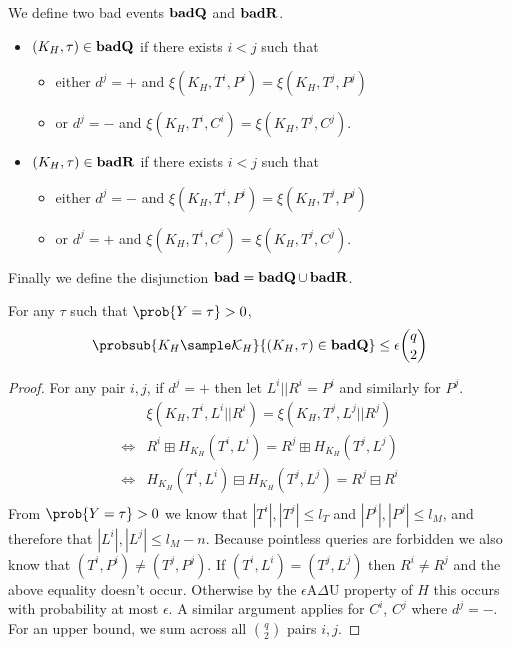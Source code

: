 \documentclass[eprint.tex]{subfiles}
\begin{document}
We define two bad events $\operatorname{\mathbf{badQ}}$ and $\operatorname{\mathbf{badR}}$.

\begin{itemize}
    \item $(K_H, \tau) \in \operatorname{\mathbf{badQ}}$ if there exists $i < j$ such that
    \begin{itemize}
        \item either $d^j = +$ and $\xi(K_H, T^i, P^i) = \xi(K_H, T^j, P^j)$
        \item or $d^j = -$ and $\xi(K_H, T^i, C^i) = \xi(K_H, T^j, C^j)$.
    \end{itemize}
    \item $(K_H, \tau) \in \operatorname{\mathbf{badR}}$ if there exists $i < j$ such that
    \begin{itemize}
        \item either $d^j = -$ and $\xi(K_H, T^i, P^i) = \xi(K_H, T^j, P^j)$
        \item or $d^j = +$ and $\xi(K_H, T^i, C^i) = \xi(K_H, T^j, C^j)$.
    \end{itemize}
\end{itemize}

Finally we define the disjunction
$\operatorname{\mathbf{bad}} = \operatorname{\mathbf{badQ}} \cup \operatorname{\mathbf{badR}}$.

\begin{lemma} \label{badQ}
    For any $\tau$ such that $\prob{Y = \tau} > 0$,
    \begin{displaymath}
        \probsub{K_H \sample \mathcal{K}_H}{(K_H, \tau) \in \badQ}
        \leq \epsilon \binom{q}{2}
    \end{displaymath}
\end{lemma}

\begin{proof}
For any pair $i, j$, if $d^j = +$ then let $L^i || R^i = P^i$ and similarly for $P^j$.
\begin{align*}
    &\xi(K_H, T^i, L^i||R^i) = \xi(K_H, T^j, L^j||R^j) \\
    \Leftrightarrow& R^i \boxplus H_{K_H}(T^i, L^i) = R^j \boxplus H_{K_H}(T^j, L^j) \\
    \Leftrightarrow& H_{K_H}(T^i, L^i) \boxminus H_{K_H}(T^j, L^j) = R^j \boxminus R^i \\
\end{align*}
From $\prob{Y = \tau} > 0$ we know that $|T^i|, |T^j| \leq l_T$ and $|P^i|, |P^j| \leq l_M$,
and therefore that $|L^i|, |L^j| \leq l_M - n$.
Because pointless queries are forbidden we also know that $(T^i, P^i) \neq (T^j, P^j)$.
If $(T^i, L^i) = (T^j, L^j)$ then $R^i \neq R^j$ and the above equality doesn't occur.
Otherwise by the $\epsilon$A$\Delta$U property of $H$ this occurs with probability
at most $\epsilon$.
A similar argument applies for $C^i$, $C^j$ where $d^j = -$.
For an upper bound, we sum across all $\binom{q}{2}$ pairs $i, j$.
\end{proof}
\end{document}
